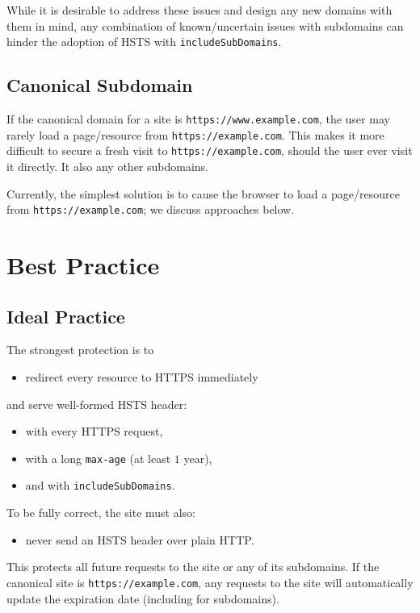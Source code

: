 \documentclass[conference]{./IEEEtran}
\newcommand{\site}[1]{\texttt{#1}}
\newcommand{\code}[1]{\texttt{#1}}
\newcommand{\iSD}{{\code{includeSubDomains}}}
\newcommand{\genericsite}{example.com}
\newcommand{\s}{{\site{https://\genericsite}}}
\newcommand{\sw}{{\site{https://www.\genericsite}}}
\theoremstyle{plain}
\begin{document}
While it is desirable to address these issues and design any new domains with them in mind, any combination of known/uncertain issues with subdomains can hinder the adoption of HSTS with \iSD.

\subsection{Canonical Subdomain}

If the canonical domain for a site is \sw, the user may rarely load a page/resource from \s. This makes it more difficult to secure a fresh visit to \s, should the user ever visit it directly. It also  any other subdomains.

Currently, the simplest solution is to cause the browser to load a page/resource from \s; we discuss approaches below.


\section{Best Practice}


\subsection{Ideal Practice}


The strongest protection is to

\begin{itemize}
\item redirect every resource to HTTPS immediately
\end{itemize}

and serve well-formed  HSTS header:

\begin{itemize}
\item with every HTTPS request,
\item with a long \code{max-age} (at least $1$ year),
\item and with \iSD.
\end{itemize}

To be fully correct, the site must also:

\begin{itemize}
\item never send an HSTS header over plain HTTP.
\end{itemize}

This protects all future requests to the site or any of its subdomains. If the canonical site is \s, any requests to the site will automatically update the expiration date (including for subdomains).
\end{document}
